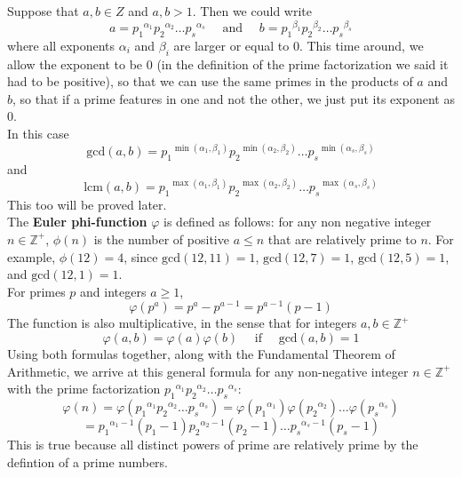 \documentclass[12pt]{article}
\newcommand{\Z}{\mathbb{Z}}
\begin{document}
    Suppose that $a, b \in Z$ and $a, b > 1$.
    Then we could write
    \[ a = {p_1}^{\alpha_1}{p_2}^{\alpha_2} \dots {p_s}^{\alpha_s}
    \quad \text{ and } \quad
    b = {p_1}^{\beta_1}{p_2}^{\beta_2} \dots {p_s}^{\beta_s} \]
    where all exponents $\alpha_i$ and $\beta_i$
    are larger or equal to $0$.
    This time around, we allow the exponent to be $0$
    (in the definition of the prime factorization
    we said it had to be positive),
    so that we can use the same primes in the products of $a$ and $b$,
    so that if a prime features in one and not the other,
    we just put its exponent as $0$. \\
    In this case
    \[ \text{gcd}(a, b) = 
    {p_1}^{\min(\alpha_1, \beta_1)}
    {p_2}^{\min(\alpha_2, \beta_2)} \dots
    {p_s}^{\min(\alpha_s, \beta_s)} \]
    and 
    \[ \text{lcm}(a, b) = 
    {p_1}^{\max(\alpha_1, \beta_1)}
    {p_2}^{\max(\alpha_2, \beta_2)} \dots
    {p_s}^{\max(\alpha_s, \beta_s)} \]
    This too will be proved later. \\

    The \textbf{Euler phi-function} $\varphi$ is defined as follows:
    for any non negative integer $n \in \Z^+$,
    $\phi(n)$ is the number of positive $a \leqslant n$
    that are relatively prime to $n$.
    For example, $\phi(12) = 4$,
    since $\text{gcd}(12, 11) = 1$,
    $\text{gcd}(12, 7) = 1$,
    $\text{gcd}(12, 5) = 1$,
    and $\text{gcd}(12, 1) = 1$. \\
    For primes $p$ and integers $a \geqslant 1$,
    \[ \varphi(p^a) = p^{a} - p^{a-1} = p^{a-1}(p - 1) \]
    The function is also multiplicative,
    in the sense that for integers $a, b \in \Z^+$
    \[ \varphi(a, b) = \varphi(a)\varphi(b)
    \quad \text{ if } \quad \text{gcd}(a, b) = 1 \]
    Using both formulas together,
    along with the Fundamental Theorem of Arithmetic,
    we arrive at this general formula
    for any non-negative integer $n \in \Z^+$
    with the prime factorization
    ${p_1}^{\alpha_1}{p_2}^{\alpha_2} \dots {p_s}^{\alpha_s}$:
    \[ \varphi(n) = 
    \varphi({p_1}^{\alpha_1}{p_2}^{\alpha_2} \dots {p_s}^{\alpha_s}) =
    \varphi({p_1}^{\alpha_1})\varphi({p_2}^{\alpha_2}) \dots 
    \varphi({p_s}^{\alpha_s})\]
    \[ = {p_1}^{\alpha_1 - 1}(p_1 - 1){p_2}^{\alpha_2 - 1}(p_2 - 1)
    \dots {p_s}^{\alpha_s - 1}(p_s - 1) \]
    This is true because all distinct powers of prime are relatively prime
    by the defintion of a prime numbers. \\
\end{document}
